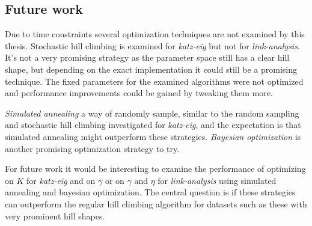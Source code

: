 \subsection{Future work}

Due to time constraints several optimization techniques are not examined by this thesis. Stochastic hill climbing is examined for \textit{katz-eig} but not for \textit{link-analysis}. It's not a very promising strategy as the parameter space still has a clear hill shape, but depending on the exact implementation it could still be a promising technique. The fixed parameters for the examined algorithms were not optimized and performance improvements could be gained by tweaking them more.

\textit{Simulated annealing} a way of randomly sample, similar to the random sampling and stochastic hill climbing investigated for \textit{katz-eig}, and the expectation is that simulated annealing might outperform these strategies. \textit{Bayesian optimization} is another promising optimization strategy to try.

For future work it would be interesting to examine the performance of optimizing on $K$ for \textit{katz-eig} and on $\gamma$ or on $\gamma$ and $\eta$ for \textit{link-analysis} using simulated annealing and bayesian optimization. The central question is if these strategies can outperform the regular hill climbing algorithm for datasets such as these with very prominent hill shapes.



